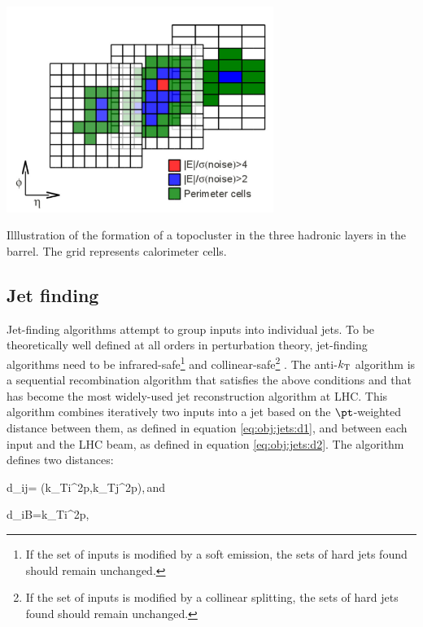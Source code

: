 \bfig[t!]
\centering
\includegraphics[width=0.65\textwidth]{figures/Objects/clusters.png}
\captionsetup{width=0.85\textwidth} \caption{\small Illlustration of the formation of a topocluster in the three hadronic layers in the barrel. The grid represents calorimeter cells.}
\label{fig:obj:jet:cluster}
\efig


\subsection{Jet finding}
Jet-finding algorithms attempt to group inputs into individual jets. To be theoretically well defined at all orders in perturbation theory, jet-finding algorithms need to be infrared-safe\footnote{If the set of inputs is modified by a soft emission, the sets of hard jets found should remain unchanged.} and collinear-safe\footnote{If the set of inputs is modified by a collinear splitting, the sets of hard jets found should remain unchanged.} \cite{Salam:2009jx}. The anti-$k_{\rm T}$ algorithm \cite{antikt} is a sequential recombination algorithm that satisfies the above conditions and that has become the most widely-used jet reconstruction algorithm at LHC. This algorithm combines iteratively two inputs into a jet based on the $\pt$-weighted distance between them, as defined in equation \ref{eq:obj:jets:d1}, and between each input and the LHC beam, as defined in equation \ref{eq:obj:jets:d2}. The algorithm defines two distances:

\be
d_{ij}= \min\left(k_{{\rm T}i}^{2p},k_{{\rm T}j}^{2p}\right),\,\textrm{and}
\label{eq:obj:jets:d1}
\ee

\be
d_{iB}=k_{{\rm T}i}^{2p},
\label{eq:obj:jets:d2}
\ee

